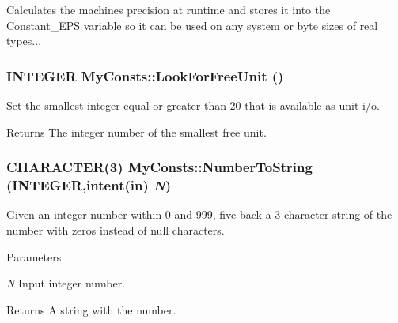 Calculates the machines precision at runtime and stores it into the Constant\_\-EPS variable so it can be used on any system or byte sizes of real types... \hypertarget{namespace_my_consts_a093b1ea96b1aa71b483171f830362952}{
\subsubsection[{LookForFreeUnit}]{\setlength{\rightskip}{0pt plus 5cm}INTEGER MyConsts::LookForFreeUnit ()}}
\label{namespace_my_consts_a093b1ea96b1aa71b483171f830362952}


Set the smallest integer equal or greater than 20 that is available as unit i/o. \begin{DoxyReturn}{Returns}
The integer number of the smallest free unit. 
\end{DoxyReturn}
\hypertarget{namespace_my_consts_a48c07e594adf4fa6121bcd79c799145b}{
\subsubsection[{NumberToString}]{\setlength{\rightskip}{0pt plus 5cm}CHARACTER(3) MyConsts::NumberToString (INTEGER,intent(in) {\em N})}}
\label{namespace_my_consts_a48c07e594adf4fa6121bcd79c799145b}


Given an integer number within 0 and 999, five back a 3 character string of the number with zeros instead of null characters. 
\begin{DoxyParams}{Parameters}
\item[{\em N}]Input integer number. \end{DoxyParams}
\begin{DoxyReturn}{Returns}
A string with the number. 
\end{DoxyReturn}


